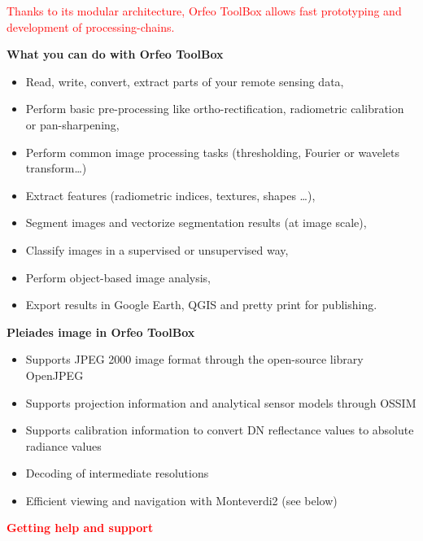 \documentclass[portrait,a0]{a0poster}
\newenvironment{poster}{
  \begin{center}
  \begin{minipage}[c]{0.99\textwidth}
}{
  \end{minipage} 
  \end{center}
}
\newcommand{\titresubsection}[1]{ 
 	\begin{center}
 	\Large{\textbf{#1}}
 	\end{center}
 }
\begin{document}
\begin{poster}
\begin{minipage}[t]{\textwidth}
\begin{minipage}[t]{0.3\textwidth}
{\textcolor{red}{Thanks to its modular architecture, Orfeo ToolBox allows fast prototyping and development of processing-chains.}
\vspace{0.5cm}}
\end{minipage}
\hfill
\begin{minipage}[t]{0.3\textwidth}
\titresubsection{What you can do with Orfeo ToolBox}
\Large{
\begin{itemize}
\item Read, write, convert, extract parts of your remote sensing data,
\item Perform basic pre-processing like ortho-rectification, radiometric calibration or pan-sharpening,
\item Perform common image processing tasks (thresholding, Fourier or wavelets
  transform\ldots)
\item Extract features (radiometric indices, textures, shapes \ldots),
\item Segment images and vectorize segmentation results (at image scale),
\item Classify images in a supervised or unsupervised way,
\item Perform object-based image analysis,
\item Export results in Google Earth, QGIS and pretty print for publishing.
\end{itemize}
}
\end{minipage}
\hfill
\begin{minipage}[t]{0.3\textwidth}
\begin{minipage}[t]{\textwidth}
\titresubsection{Pleiades image in Orfeo ToolBox}
\Large{
\begin{itemize}
\item Supports JPEG 2000 image format through the open-source library OpenJPEG
\item Supports projection information and analytical sensor models through OSSIM
\item Supports calibration information to convert DN reflectance values to absolute radiance values
\item Decoding of intermediate resolutions
\item Efficient viewing and navigation with Monteverdi2 (see below)\\
\end{itemize}
}
\end{minipage}
\begin{minipage}[t]{\textwidth}
\titresubsection{\textcolor{red}{Getting help and support}}
\Large{
\begin{itemize}

\end{itemize}}
\end{minipage}
\end{minipage}
\end{minipage}
\end{poster}
\end{document}

